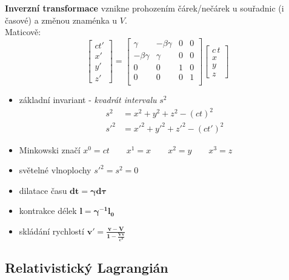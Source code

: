 \documentclass[a5paper,12pt]{article}
\begin{document}
\textbf{Inverzní transformace} vznikne prohozením čárek/nečárek u souřadnic (i časové) a změnou znaménka u $V$.\\

\noindent Maticově:
\begin{equation*}
	\begin{bmatrix}c t' \\ x' \\ y' \\ z'\end{bmatrix}
	=
	\begin{bmatrix}\gamma&-\beta \gamma&0&0\\-\beta \gamma&\gamma&0&0\\0&0&1&0\\0&0&0&1\\\end{bmatrix}
	\begin{bmatrix}c\,t \\ x \\ y \\ z\end{bmatrix}
\end{equation*}

\begin{itemize}
	\item základní invariant - \textit{kvadrát intervalu} $s^2$
	\begin{align*}
	s^2 &= x^2 + y^2 + z^2 - (ct)^2\\
	s'^2 &= x'^2 + y'^2 + z'^2 - (ct')^2
	\end{align*}

	\item Minkowski značí $x^0 = ct \qquad x^1 = x \qquad x^2 = y \qquad x^3 = z$
	
	\item světelné vlnoplochy $s'^2 = s^2 = 0$
	
	\item dilatace času $\boldsymbol{dt = \gamma d\tau}$
	
	\item kontrakce délek $\boldsymbol{l = \gamma{}^{-1} l_0}$
	
	\item skládání rychlostí $\boldsymbol{v' = \frac{v - V}{1 - \frac{Vv}{c^2}}}$
	
\end{itemize}

\subsection{Relativistický Lagrangián}
\end{document}
